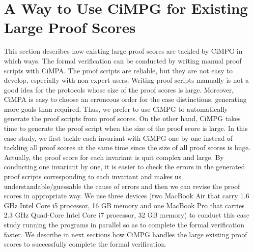 \documentclass[a4paper,fleqn]{cas-dc}
\begin{document}
\section{A Way to Use CiMPG for Existing Large Proof Scores}\label{fvtls}
This section describes how existing large proof scores are tackled by CiMPG in which ways. The formal verification can be conducted by writing manual proof scripts with CiMPA. The proof scripts are reliable, but they are not easy to develop, especially with non-expert users. Writing proof scripts manually is not a good idea for the protocols whose size of the proof scores is large. Moreover, CiMPA is easy to choose an erroneous order for the case distinctions, generating more goals than required. Thus, we prefer to use CiMPG to automatically generate the proof scripts from proof scores. On the other hand, CiMPG takes time to generate the proof script when the size of the proof score is large. In this case study, we first tackle each invariant with CiMPG one by one instead of tackling all proof scores at the same time since the size of all proof scores is huge. Actually, the proof score for each invariant is quit complex and large. By conducting one invariant by one, it is easier to check the errors in the generated proof scripts corresponding to each invariant and makes us understandable/guessable the cause of errors and then we can revise the proof scores in appropriate way. We use three devices (two MacBook Air that carry 1.6 GHz Intel Core i5 processor, 16 GB memory and one MacBook Pro that carries 2.3 GHz Quad-Core Intel Core i7 processor, 32 GB memory) to conduct this case study running the programs in parallel so as to complete the formal verification faster. We describe in next sections how CiMPG handles the large existing proof scores to successfully complete the formal verification. 
\end{document}
